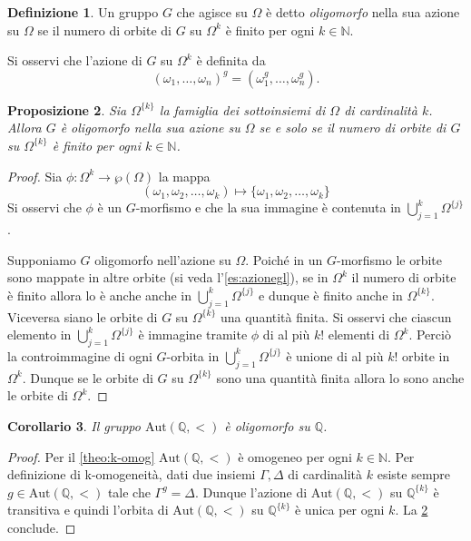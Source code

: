 \documentclass[12pt,a4paper,openright]{report}
\newcommand{\aut}{ \mathrm{Aut} ( \mathbb{Q},< ) } %
\newcommand{\N}{\mathbb{N}} %
\newcommand{\Q}{\mathbb{Q}} %
\newcommand{\0}{\setminus\{0\}} %
\theoremstyle{definition}
\newtheorem{defn}{Definizione}[chapter]
\theoremstyle{plain}
\newtheorem{cor}[defn]{Corollario}
\newtheorem{prop}[defn]{Proposizione}
\begin{document}
\begin{defn}
    Un gruppo $G$ che agisce su $\Omega$ è detto \emph{oligomorfo} nella sua azione su $\Omega$ se il numero di orbite di $G$ su $\Omega^k$ è finito per ogni $k \in \N$.
\end{defn}
 Si osservi che l'azione di $G$ su $\Omega^k$ è definita da \[\left(\omega_1,\ldots,\omega_n\right)^g=\left(\omega_1^g,\ldots,\omega_n^g\right).\]
 \begin{prop}\label{prop:oligomorf}
    Sia $\Omega^{\{k\}}$ la famiglia dei sottoinsiemi di $\Omega$ di cardinalità $k$.
    Allora $G$ è oligomorfo nella sua azione su $\Omega$ se e solo se il numero di orbite di $G$ su $\Omega^{\{k\}}$ è finito per ogni $k \in \N$.
 \end{prop}
 \begin{proof}
    Sia $\phi: \Omega^k \rightarrow \wp(\Omega)$ la mappa
    \[(\omega_1,\omega_2,\ldots,\omega_k) \mapsto \{\omega_1,\omega_2,\ldots,\omega_k\}\]
    Si osservi che $\phi$ è un $G$-morfismo e che la sua immagine è contenuta in $\bigcup_{j=1}^k \Omega^{\{j\}}$. 

    Supponiamo $G$ oligomorfo nell'azione su $\Omega$. Poiché in un $G$-morfismo le orbite sono mappate in altre orbite (si veda l'\cref{es:azionegl}), se in $\Omega^k$ il numero di orbite è finito allora lo è anche anche in $\bigcup_{j=1}^k \Omega^{\{j\}}$ e dunque è finito anche in $\Omega^{\{k\}}$. \\
    Viceversa siano le orbite di $G$ su $\Omega^{\{k\}}$ una quantità finita. Si osservi che ciascun elemento in $\bigcup_{j=1}^k \Omega^{\{j\}}$ è immagine tramite $\phi$ di al più $k!$ elementi di $\Omega^k$. Perciò la controimmagine di ogni $G$-orbita in $\bigcup_{j=1}^k \Omega^{\{j\}}$ è unione di al più $k!$ orbite in $\Omega^k$.
    Dunque se le orbite di $G$ su $\Omega^{\{k\}}$ sono una quantità finita allora lo sono anche le orbite di $\Omega^k$.
 \end{proof}
 \begin{cor}
    Il gruppo $\aut$ è oligomorfo su $\Q$.
 \end{cor}
 \begin{proof}
    Per il \cref{theo:k-omog} $\aut$ è omogeneo per ogni $k \in \mathbb{N}$. Per definizione di k-omogeneità, dati due insiemi $\Gamma,\Delta$ di cardinalità $k$ esiste sempre $g \in \aut$ tale che $\Gamma^g=\Delta$. Dunque l'azione di $\aut$ su $\Q^{\{k\}}$ è transitiva e quindi l'orbita di $\aut$ su $\Q^{\{k\}}$ è unica per ogni $k$. La \cref{prop:oligomorf} conclude.
 \end{proof}


\tableofcontents

\nocite{bhat}
\nocite{dixon}
\nocite{hunger}
\printbibliography[heading=bibintoc]
\end{document}
